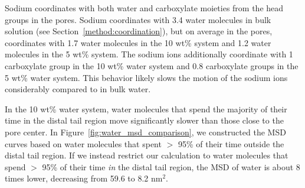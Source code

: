\documentclass[journal=jpcbfk,manuscript=article]{achemso}
\begin{document}
  Sodium coordinates with both water and carboxylate moieties from the head
  groups in the pores. Sodium coordinates with 3.4 water molecules in bulk 
  solution (see Section~\ref{method:coordination}), but on average in the pores,
  coordinates with 1.7 water molecules in the 10 wt\% system and 1.2 water
  molecules in the 5 wt\% system. The sodium ions additionally coordinate with
  1 carboxylate group in the 10 wt\% water system and 0.8 carboxylate groups 
  in the 5 wt\% water system. This behavior likely slows the motion of the 
  sodium ions considerably compared to in bulk water.

  In the 10 wt\% water system, water molecules that spend the majority of 
  their time in the distal tail region move significantly slower than those
  close to the pore center. In Figure~\ref{fig:water_msd_comparison}, we 
  constructed the MSD curves based on water molecules that spent $>$ 95\% of their
  time outside the distal tail region. If we instead restrict our calculation to
  water molecules that spend $>$ 95\% of their time \textit{in} the distal tail region, 
  the MSD of water is about 8 times lower, decreasing from 59.6 to 8.2 nm$^2$. 
  
\end{document}
